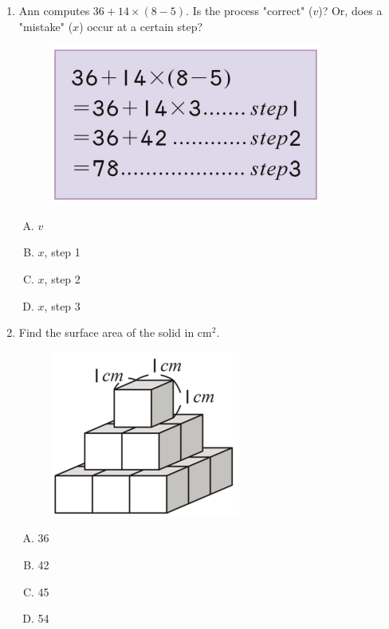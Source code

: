 \documentclass[12pt]{scrartcl}
\begin{document}
\begin{enumerate}[resume]
\item Ann computes $36 + 14 \times (8 - 5)$. Is the process "correct" ($v$)? Or, does a "mistake" ($x$) occur at a certain step?
        \begin{figure}[h]
            \centering
            \includegraphics[scale=0.5]{StarGen/0Figure/wmi-2020-5a-11.png}
        \end{figure}
    \begin{multicols}{4}
        \begin{enumerate}[(A)]
            \item $v$
            \item $x$, step 1
            \item $x$, step 2
            \item $x$, step 3
        \end{enumerate}
    \end{multicols} \hrulefill

\item Find the surface area of the solid in cm$^2$.
    \begin{figure}[h]
        \centering
        \includegraphics[scale=0.6]{StarGen/0Figure/wmi-2020-5a-12.png}
    \end{figure}
    \begin{multicols}{4}
        \begin{enumerate}[(A)]
            \item 36
            \item 42
            \item 45
            \item 54
        \end{enumerate}
    \end{multicols} \hrulefill


\end{enumerate}
\end{document}
